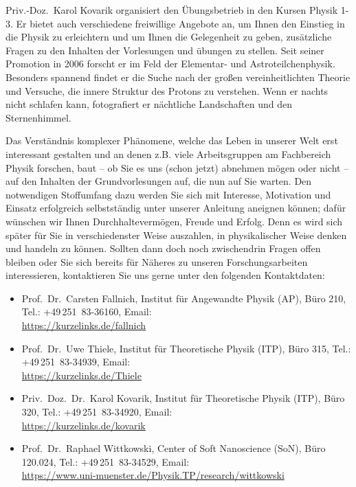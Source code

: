 \begin{multicols}{2}
Priv.-Doz.~Karol Kovarik organisiert den Übungsbetrieb in den Kursen Physik 1-3. Er bietet auch verschiedene freiwillige Angebote an, um Ihnen den Einstieg in die Physik zu erleichtern und um Ihnen die Gelegenheit zu geben, zusätzliche Fragen zu den Inhalten der Vorlesungen und übungen zu stellen. Seit seiner Promotion in 2006 forscht er im Feld der Elementar- und Astroteilchenphysik. Besonders spannend findet er die Suche nach der gro{\ss}en vereinheitlichten Theorie und Versuche, die innere Struktur des Protons zu verstehen. Wenn er nachts nicht schlafen kann, fotografiert er nächtliche Landschaften und den Sternenhimmel.

Das Verständnis komplexer Phänomene, welche das Leben in unserer Welt erst interessant gestalten und an denen z.B. viele  Arbeitsgruppen am Fachbereich Physik forschen, baut -- ob Sie es uns (schon jetzt) abnehmen mögen oder nicht -- auf den Inhalten der Grundvorlesungen auf, die nun auf Sie warten. Den notwendigen Stoffumfang dazu werden Sie sich mit Interesse, Motivation und Einsatz erfolgreich selbstständig unter unserer Anleitung aneignen können; dafür wünschen wir Ihnen Durchhaltevermögen, Freude und Erfolg. Denn es wird sich später für Sie in verschiedenster Weise auszahlen, in physikalischer Weise denken und handeln zu können. Sollten dann doch noch zwischendrin Fragen offen bleiben oder Sie sich bereits für Näheres zu unseren Forschungsarbeiten interessieren, kontaktieren Sie uns gerne unter den folgenden Kontaktdaten:\\

\begin{itemize}
\item Prof.\ Dr.\ Carsten Fallnich, Institut für Angewandte Physik (AP), Büro 210, Tel.: +49\,251~83-36160, Email:  \\ \url{https://kurzelinks.de/fallnich} 

\item Prof.\ Dr.\ Uwe Thiele, Institut für Theoretische Physik (ITP), Büro 315,  Tel.: +49\,251~83-34939, Email:  \\ \url{https://kurzelinks.de/Thiele} 

\item Priv.\ Doz.\ Dr.\ Karol Kovarik, Institut für Theoretische Physik (ITP), Büro 320, Tel.: +49\,251~83-34920, Email:  \\ \url{https://kurzelinks.de/kovarik} 

\item Prof.\ Dr.\ Raphael Wittkowski, Center of Soft Nanoscience (SoN), Büro 120.024, Tel.: +49\,251~83-34529, Email:  \\ \url{https://www.uni-muenster.de/Physik.TP/research/wittkowski} 
\end{itemize}


\end{multicols}
